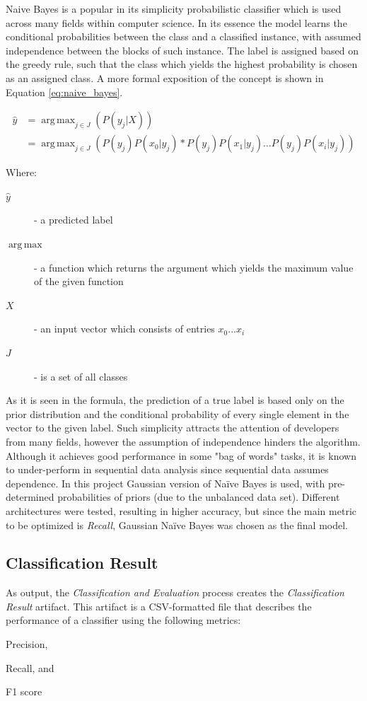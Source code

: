 \documentclass[conference]{sig-alternate-05-2015}
\DeclareMathOperator*{\argmax}{arg\,max}
\begin{document}
Naive Bayes is a popular in its simplicity probabilistic classifier which is
used across many fields within computer science. In its essence the model learns
the conditional probabilities between the class and a classified instance, with
assumed independence between the blocks of such instance. The label is assigned
based on the greedy rule, such that the class which yields the highest
probability is chosen as an assigned class. A more formal exposition of the
concept is shown in Equation \ref{eq:naive_bayes}.\par

\noindent\hrulefill
\begin{equation}
  \label{eq:naive_bayes}
  \begin{aligned}
    \hat{y}&=\argmax_{j \in J}(P(y_j|X)) \\
    &=\argmax_{j\in J}(P(y_j)P(x_0 | y_j) * P(y_j)P(x_1 | y_j) \ldots P(y_j)P(x_i | y_j) )
  \end{aligned}
\end{equation}

\noindent Where:
\begin{description}
  \item[$\hat{y}$] - a predicted label
  \item[$\argmax$] - a function which returns the argument which yields the
  maximum value of the given function
  \item[$X$] - an input vector which consists of entries ${x_0 ... x_i}$
  \item[$J$] - is a set of all classes
\end{description}
\noindent\hrulefill

As it is seen in the formula, the prediction of a true label is based only on
the prior distribution and the conditional probability of every single element
in the vector to the given label. Such simplicity attracts the attention of
developers from many fields, however the assumption of independence hinders the
algorithm. Although it achieves good performance in some "bag of words" tasks,
it is known to under-perform in sequential data analysis since sequential data
assumes dependence. In this project Gaussian version of Na\"ive Bayes is used,
with pre-determined probabilities of priors (due to the unbalanced data set).
Different architectures were tested, resulting in higher accuracy, but since the
main metric to be optimized is \textit{Recall}, Gaussian Na\"ive Bayes was
chosen as the final model.

\subsection{Classification Result}\label{subsec:classification_result}
As output, the \textit{Classification and Evaluation} process creates the
\textit{Classification Result} artifact. This artifact is a CSV-formatted file
that describes the performance of a classifier using the following metrics:
\begin{enumerate*}[(1)]
  \item Precision,
  \item Recall, and
  \item F1 score
\end{enumerate*}
\end{document}
